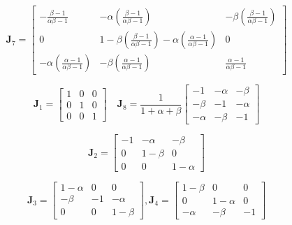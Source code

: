 \documentclass[twocolumn,aps,prl]{revtex4-1}
\newcommand{\talf}{\frac{\alpha - 1}{\alpha \beta - 1} }
\newcommand{\tbet}{\frac{\beta  - 1}{\alpha \beta - 1} }
\begin{document}
$$
\mathbf{J}_7 = 
\begin{bmatrix}
    -\tbet & - \alpha (\tbet) & - \beta (\tbet) \\
    0 & 1 - \beta (\tbet) - \alpha (\talf) & 0 \\
    - \alpha (\talf) & - \beta (\talf) & \talf
\end{bmatrix}
$$


$$
\mathbf{J}_1 = 
\begin{bmatrix}
    1  & 0 & 0 \\
    0 & 1 & 0 \\
    0 & 0 & 1
\end{bmatrix}
\quad 
\mathbf{J}_8 = 
\frac{1}{1+\alpha+\beta}\begin{bmatrix}
    -1 & -\alpha & -\beta \\
    -\beta & -1 & -\alpha \\
    -\alpha & -\beta & -1
\end{bmatrix}
$$

$$
\mathbf{J}_2 = 
\begin{bmatrix}
    -1 & - \alpha & - \beta \\
    0 & 1-\beta & 0 \\
    0 & 0 & 1- \alpha
\end{bmatrix}
$$

$$
\mathbf{J}_3 = 
\begin{bmatrix}
    1 - \alpha  & 0 & 0 \\
    - \beta & -1 & - \alpha \\
    0 & 0 & 1  - \beta
\end{bmatrix}
,
\mathbf{J}_4 = 
\begin{bmatrix}
    1 - \beta  & 0 & 0 \\
    0 & 1 -\alpha  & 0 \\
    - \alpha  & -\beta & -1
\end{bmatrix}
$$
\end{document}
